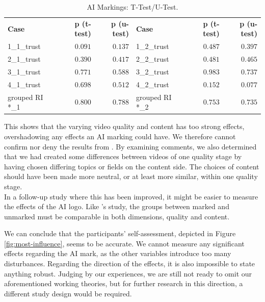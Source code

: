 \documentclass[
  a4paper,  %
  twoside,  %
  bibliography=totoc,
  headsepline,
  cleardoublepage=empty,
  parskip=half,
  draft=false
]{scrbook}
\begin{document}
\begin{table}[h]
	\centering
	\caption{AI Markings: T-Test/U-Test.}
	\label{tab:ttest_logo-trust}
	{
		\begin{tabular}{lrr|lrr}
			\toprule
			\textbf{Case} & \textbf{p (t-test)} & \textbf{p (u-test)} & \textbf{Case} & \textbf{p (t-test)} & \textbf{p (u-test)}  \\
			\cmidrule[0.4pt]{1-6}
			1\_1\_trust & $0.091$ & $0.137$ & 1\_2\_trust & $0.487$ & $0.397$ \\
			2\_1\_trust & $0.390$ & $0.417$ & 2\_2\_trust & $0.481$ & $0.465$ \\
			3\_1\_trust & $0.771$ & $0.588$ & 3\_2\_trust & $0.983$ & $0.737$ \\
			4\_1\_trust & $0.698$ & $0.512$ & 4\_2\_trust & $0.152$ & $0.077$ \\
			grouped RI *\_1 & $0.800$ & $0.788$ & grouped RI *\_2 & $0.753$ & $0.735$\\
			\bottomrule
		\end{tabular}
	}
\end{table}

This shows that the varying video quality and content has too strong effects, overshadowing any effects an AI marking could have. We therefore cannot confirm nor deny the results from . By examining comments, we also determined that we had created some differences between videos of one quality stage by having chosen differing topics or fields on the content side. The choices of content should have been made more neutral, or at least more similar, within one quality stage. \\
In a follow-up study where this has been improved, it might be easier to measure the effects of the AI logo. Like 's study, the groups between marked and unmarked must be comparable in both dimensions, quality and content.

We can conclude that the participants' self-assessment, depicted in Figure \ref{fig:most-influence}, seems to be accurate. We cannot measure any significant effects regarding the AI mark, as the other variables introduce too many disturbances. Regarding the direction of the effects, it is also impossible to state anything robust. Judging by our experiences, we are still not ready to omit our aforementioned working theories, but for further research in this direction, a different study design would be required.
\end{document}
